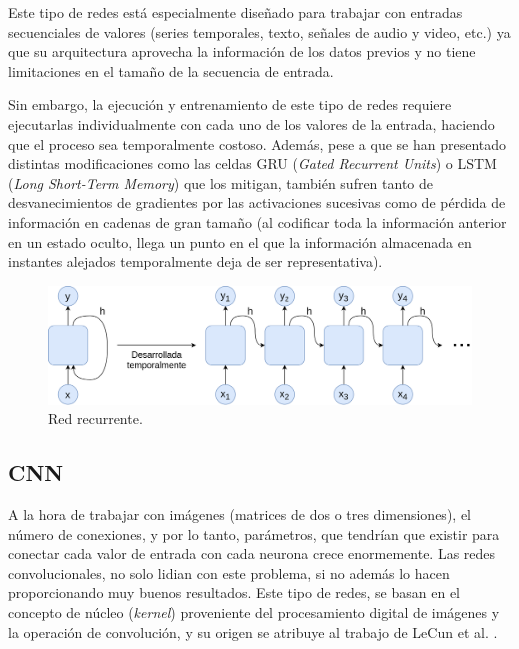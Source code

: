 Este tipo de redes está especialmente diseñado para trabajar con entradas secuenciales de valores (series temporales, texto, señales de audio y video, etc.) ya que su arquitectura aprovecha la información de los datos previos y no tiene limitaciones en el tamaño de la secuencia de entrada.

Sin embargo, la ejecución y entrenamiento de este tipo de redes requiere ejecutarlas individualmente con cada uno de los valores de la entrada, haciendo que el proceso sea temporalmente costoso. Además, pese a que se han presentado distintas modificaciones como las celdas GRU (\textit{Gated Recurrent Units}) \cite{cho-etal-2014-learning} o LSTM (\textit{Long Short-Term Memory}) \cite{HochSchm97} que los mitigan, también sufren tanto de desvanecimientos de gradientes por las activaciones sucesivas como de pérdida de información en cadenas de gran tamaño (al codificar toda la información anterior en un estado oculto, llega un punto en el que la información almacenada en instantes alejados temporalmente deja de ser representativa).

\begin{figure}[H]
\centering
\includegraphics[width=0.8\linewidth]{imagenes/rnn.png} 
\captionsetup{width=.8\linewidth}
\caption{Red recurrente.}
\label{fig:rnn}
\end{figure}

\subsection{CNN}
A la hora de trabajar con imágenes (matrices de dos o tres dimensiones), el número de conexiones, y por lo tanto, parámetros, que tendrían que existir para conectar cada valor de entrada con cada neurona crece enormemente. Las redes convolucionales, no solo lidian con este problema, si no además lo hacen proporcionando muy buenos resultados. Este tipo de redes, se basan en el concepto de núcleo (\textit{kernel}) proveniente del procesamiento digital de imágenes y la operación de convolución, y su origen se atribuye al trabajo de LeCun et al. \cite{LeCun1999}.

